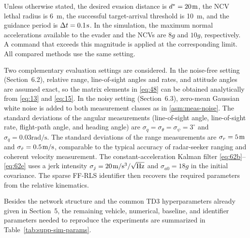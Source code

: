 Unless otherwise stated, the desired evasion distance is ${d^*} = 20{\kern 1pt} {\text{m}}$, the NCV lethal radius is 6~m, the successful target-arrival threshold is 10~m, and the guidance period is $\Delta t = 0.1{\kern 1pt} {\text{s}}$. In the simulation, the maximum normal accelerations available to the evader and the NCVs are $8g$ and $10g$, respectively. A command that exceeds this magnitude is applied at the corresponding limit. All compared methods use the same setting.

Two complementary evaluation settings are considered. In the noise-free setting (Section~6.2), relative range, line-of-sight angles and rates, and attitude angles are assumed exact, so the matrix elements in \eqref{eq:48} can be obtained analytically from \eqref{eq:13} and \eqref{eq:15}. In the noisy setting (Section~6.3), zero-mean Gaussian white noise is added to both measurement classes as in \cref{asm:meas-noise}. The standard deviations of the angular measurements (line-of-sight angle, line-of-sight rate, flight-path angle, and heading angle) are ${\sigma _q} = {\sigma _\theta } = {\sigma _\psi } = {3^ \circ }$ and ${\sigma _{\dot q}} = 0.03{\text{rad/s}}$. The standard deviations of the range measurements are ${\sigma _r} = 5{\kern 1pt} {\text{m}}$ and ${\sigma _{\dot r}} = 0.5{\kern 1pt} {\text{m/s}}$, comparable to the typical accuracy of radar-seeker ranging and coherent velocity measurement. The constant-acceleration Kalman filter \eqref{eq:62b}--\eqref{eq:62e} uses a jerk intensity ${\sigma _j} = 20{\kern 1pt} {\text{m/}}{{\text{s}}^{\text{3}}}{\text{/}}\sqrt {{\text{Hz}}} $ and ${\sigma _{a0}} = 18g$ in the initial covariance. The sparse FF-RLS identifier then recovers the required parameters from the relative kinematics.

Besides the network structure and the common TD3 hyperparameters already given in Section~5, the remaining vehicle, numerical, baseline, and identifier parameters needed to reproduce the experiments are summarized in Table~\ref{tab:supp-sim-params}.

